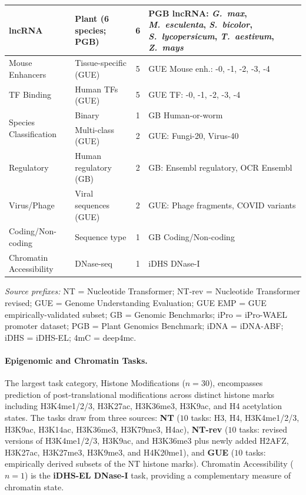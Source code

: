 \documentclass{article}
\theoremstyle{plain}
\theoremstyle{definition}
\theoremstyle{remark}
\begin{document}
\begin{table}[h]
\begin{tabular}{@{}llcp{9.5cm}@{}}
\midrule
lncRNA & Plant (6 species; PGB) & 6 & PGB lncRNA: \emph{G.\ max}, \emph{M.\ esculenta}, \emph{S.\ bicolor}, \emph{S.\ lycopersicum}, \emph{T.\ aestivum}, \emph{Z.\ mays} \\
\midrule
Mouse Enhancers & Tissue-specific (GUE) & 5 & GUE Mouse enh.: -0, -1, -2, -3, -4 \\
\midrule
TF Binding & Human TFs (GUE) & 5 & GUE TF: -0, -1, -2, -3, -4 \\
\midrule
\multirow{2}{*}{Species Classification} & Binary & 1 & GB Human-or-worm \\
 & Multi-class (GUE) & 2 & GUE: Fungi-20, Virus-40 \\
\midrule
Regulatory & Human regulatory (GB) & 2 & GB: Ensembl regulatory, OCR Ensembl \\
\midrule
Virus/Phage & Viral sequences (GUE) & 2 & GUE: Phage fragments, COVID variants \\
\midrule
Coding/Non-coding & Sequence type & 1 & GB Coding/Non-coding \\
\midrule
Chromatin Accessibility & DNase-seq & 1 & iDHS DNase-I \\
\bottomrule
\end{tabular}
\vspace{1mm}
\begin{flushleft}
\footnotesize\textit{Source prefixes:} NT = Nucleotide Transformer; NT-rev = Nucleotide Transformer revised; GUE = Genome Understanding Evaluation; GUE EMP = GUE empirically-validated subset; GB = Genomic Benchmarks; iPro = iPro-WAEL promoter dataset; PGB = Plant Genomics Benchmark; iDNA = iDNA-ABF; iDHS = iDHS-EL; 4mC = deep4mc.
\end{flushleft}
\end{table}

\paragraph{Epigenomic and Chromatin Tasks.} The largest task
category, Histone Modifications ($n=30$), encompasses prediction
of post-translational modifications across distinct histone
marks including H3K4me1/2/3, H3K27ac, H3K36me3, H3K9ac, and H4
acetylation states. The tasks draw from three sources: \textbf{NT}
($10$ tasks: H3, H4, H3K4me1/2/3, H3K9ac, H3K14ac, H3K36me3,
H3K79me3, H4ac), \textbf{NT-rev} ($10$ tasks: revised versions
of H3K4me1/2/3, H3K9ac, and H3K36me3 plus newly added H2AFZ,
H3K27ac, H3K27me3, H3K9me3, and H4K20me1), and \textbf{GUE}
($10$ tasks: empirically derived subsets of the
NT histone marks). Chromatin Accessibility ($n=1$) is the
\textbf{iDHS-EL DNase-I} task, providing a complementary measure
of chromatin state.
\end{document}
